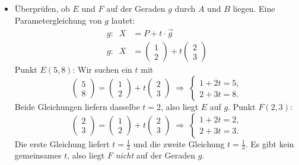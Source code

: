\begin{loesung}
\begin{itemize}
        \item[6.] Überprüfen, ob \(E\) und \(F\) auf der Geraden \(g\) durch \(A\) und \(B\) liegen.
        Eine Parametergleichung von \(g\) lautet:
        \begin{align*}
            g:\;\; X &= P + t \cdot \vec{g} \\
            g:\;\; X &= \begin{pmatrix}1 \\ 2\end{pmatrix} + t \begin{pmatrix}2 \\ 3\end{pmatrix}
        \end{align*}
        Punkt \(E(5,8)\):
        Wir suchen ein \(t\) mit
        \[
            \begin{pmatrix}5 \\ 8\end{pmatrix} =
            \begin{pmatrix}1 \\ 2\end{pmatrix}
            + t \begin{pmatrix}2 \\ 3\end{pmatrix}      
            \;\Rightarrow\;
            \begin{cases}
                1 + 2t = 5, \\
                2 + 3t = 8.
            \end{cases}
        \]
        Beide Gleichungen liefern dasselbe \(t=2\), also liegt \(E\) auf \(g\).
        Punkt \(F(2,3)\):
        \[
            \begin{pmatrix}2 \\ 3\end{pmatrix} =
            \begin{pmatrix}1 \\ 2\end{pmatrix}
            + t \begin{pmatrix}2 \\ 3\end{pmatrix}
            \;\Rightarrow\;
            \begin{cases}
                1 + 2t = 2, \\
                2 + 3t = 3.
            \end{cases}
        \]
        Die erste Gleichung liefert $t=\frac{1}{2}$ und die zweite Gleichung $t=\frac{1}{3}$. Es gibt kein gemeinsames \(t\), also liegt \(F\) \emph{nicht} auf der Geraden \(g\).


\end{itemize}
\end{loesung}
